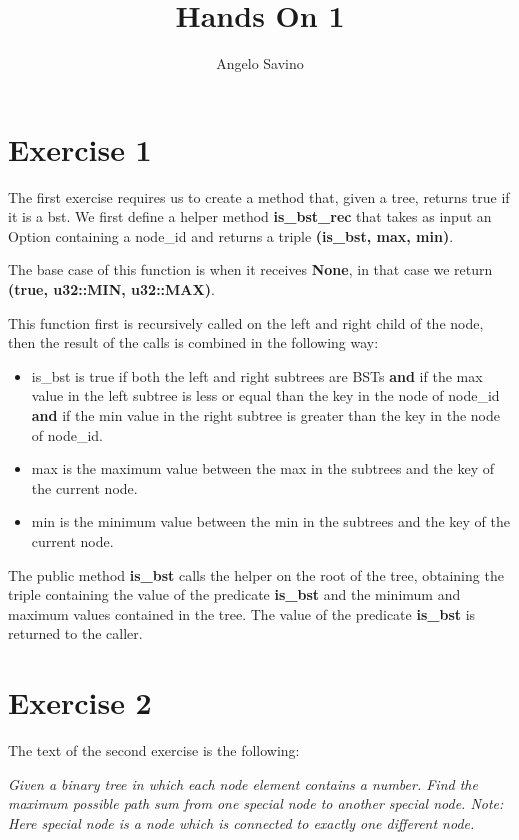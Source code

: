 \documentclass[12pt,a4paper]{article}
\title{Hands On 1}
\author{Angelo Savino}
\begin{document}
\maketitle

\section*{Exercise 1}
The first exercise requires us to create a method that, given a tree, returns true if it is a bst.
We first define a helper method \textbf{is\_bst\_rec} that takes as input an Option containing a node\_id and returns a triple \textbf{(is\_bst, max, min)}. 

The base case of this function is when it receives \textbf{None}, in that case we return \textbf{(true, u32::MIN, u32::MAX)}.

This function first is recursively called on the left and right child of the node, then the result of the calls is combined in the following way:

\begin{itemize}
    \item is\_bst is true if both the left and right subtrees are BSTs \textbf{and} if the max value in the left subtree is less or equal than the key in the node of node\_id \textbf{and} if the min value in the right subtree is greater than the key in the node of node\_id.
    \item max is the maximum value between the max in the subtrees and the key of the current node.
    \item min is the minimum value between the min in the subtrees and the key of the current node.
\end{itemize}

The public method \textbf{is\_bst} calls the helper on the root of the tree, obtaining the triple containing the value of the predicate \textbf{is\_bst} and the minimum and maximum values contained in the tree. The value of the predicate \textbf{is\_bst} is returned to the caller.

\pagebreak
\section*{Exercise 2}
The text of the second exercise is the following:

\textit{Given a binary tree in which each node element contains a number. Find the maximum possible path sum from one special node to another special node.
Note: Here special node is a node which is connected to exactly one different node.}
\end{document}
